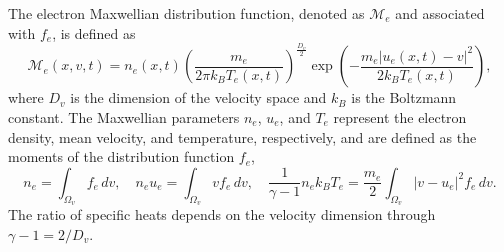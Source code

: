 \documentclass[pdflatex,final,10pt]{article}
\newcommand{\Fabrice}[1]{#1}
\begin{document}
The electron Maxwellian distribution function, \Fabrice{denoted as $\mathcal{M}_{e}$ and associated with $f_e$, is defined as}
\begin{equation*}
    \mathcal{M}_{e}(x,v,t) = n_e(x,t) \left( \frac{m_e}{2\pi k_B T_e(x,t)} \right)^{\frac{D_v}{2}} \exp \left( -\frac{m_e|u_e(x,t)-v|^{2}}{2k_BT_e(x,t)} \right),
\end{equation*}
where $D_v$ is the dimension of the velocity space and $k_B$ is the Boltzmann constant. The Maxwellian parameters $n_e$, $u_e$, and $T_e$ represent the electron density, mean velocity, and temperature, respectively, \Fabrice{and are defined as the moments of the distribution function $f_e$,}
\begin{equation*}
    n_e=\int_{\Omega_v}f_e\,d v,\quad
    n_e u_e=\int_{\Omega_v}v f_e\,dv,\quad
    \frac{1}{\gamma-1}n_e k_BT_e=\frac{m_e}{2}\int_{\Omega_v}|v-u_e|^2 f_e\,dv.
\end{equation*}
The ratio of specific heats depends on the velocity dimension through $\gamma-1 = {2/D_v}$.
\end{document}
